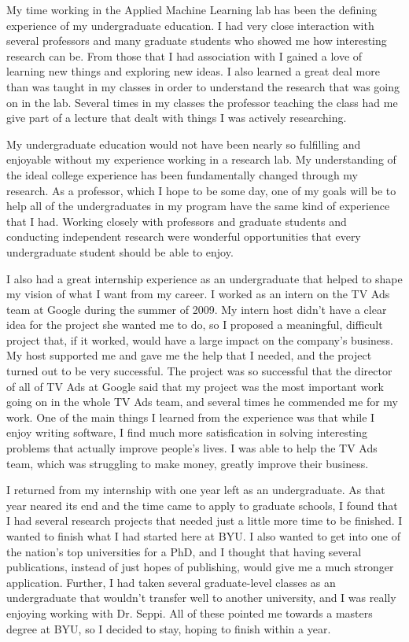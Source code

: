 \documentclass[onecolumn, 12pt]{article}
\begin{document}
My time working in the Applied Machine Learning lab has been the defining
experience of my undergraduate education.  I had very close interaction with
several professors and many graduate students who showed me how interesting
research can be.  From those that I had association with I gained a love of
learning new things and exploring new ideas.  I also learned a great deal more
than was taught in my classes in order to understand the research that was
going on in the lab.  Several times in my classes the professor teaching the
class had me give part of a lecture that dealt with things I was actively
researching.  

My undergraduate education would not have been nearly so fulfilling and
enjoyable without my experience working in a research lab.  My understanding of
the ideal college experience has been fundamentally changed through my
research.  As a professor, which I hope to be some day, one of my goals will be
to help all of the undergraduates in my program have the same kind of
experience that I had.  Working closely with professors and graduate students
and conducting independent research were wonderful opportunities that every
undergraduate student should be able to enjoy.

I also had a great internship experience as an undergraduate that helped to
shape my vision of what I want from my career.  I worked as an intern on the TV
Ads team at Google during the summer of 2009.  My intern host didn't have a
clear idea for the project she wanted me to do, so I proposed a meaningful,
difficult project that, if it worked, would have a large impact on the
company's business.  My host supported me and gave me the help that I needed,
and the project turned out to be very successful.  The project was so
successful that the director of all of TV Ads at Google said that my project
was the most important work going on in the whole TV Ads team, and several
times he commended me for my work.  One of the main things I learned from the
experience was that while I enjoy writing software, I find much more
satisfication in solving interesting problems that actually improve people's
lives.  I was able to help the TV Ads team, which was struggling to make money,
greatly improve their business.

I returned from my internship with one year left as an undergraduate.  As that
year neared its end and the time came to apply to graduate schools, I found
that I had several research projects that needed just a little more time to be
finished.  I wanted to finish what I had started here at BYU.  I also wanted to
get into one of the nation's top universities for a PhD, and I thought that
having several publications, instead of just hopes of publishing, would give me
a much stronger application.  Further, I had taken several graduate-level
classes as an undergraduate that wouldn't transfer well to another university,
and I was really enjoying working with Dr. Seppi.  All of these pointed me
towards a masters degree at BYU, so I decided to stay, hoping to finish within
a year.
\end{document}
